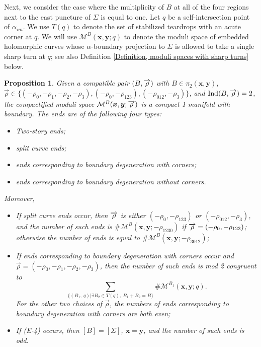\documentclass{amsart}
\newtheorem{prop}[thm]{Proposition}
\theoremstyle{definition}
\theoremstyle{remark}
\numberwithin{equation}{section}
\numberwithin{equation}{section} \makeatletter
\begin{document}
Next, we consider the case where the multiplicity of $B$ at all of the four regions next to the east puncture of $\Sigma$ is equal to one. Let $q$ be a self-intersection point of $\alpha_{im}$. We use $T(q)$ to denote the set of stabilized teardrops with an acute corner at $q$. We will use $\mathcal{M}^{B}(\bm{x},\bm{y};q)$ to denote the moduli space of embedded holomorphic curves whose $\alpha$-boundary projection to $\Sigma$ is allowed to take a single sharp turn at $q$; see also Definition \ref{Definition, moduli spaces with sharp turns} below.  

\begin{prop}\label{Proposition, ends of 1-dimensional moduli spaces of 0-P curves, Reeb element of length 4}
Given a compatible pair $(B,\overrightarrow{\bold{\rho}})$ with $B\in \pi_2(\bm{x},\bm{y})$, $\overrightarrow{\rho}\in\{(-\rho_0,-\rho_1,-\rho_2,-\rho_3),(-\rho_0,-\rho_{123}),(-\rho_{012},-\rho_3)\}$, and $\text{Ind}(B,\overrightarrow{\bold{\rho}})=2$, the compactified moduli space $\mathcal{M}^B(\bm{x},\bm{y};\overrightarrow{\bold{\rho}})$ is a compact 1-manifold with boundary. The ends are of the following four types:
\begin{itemize}
\item[(E-1)]Two-story ends;
\item[(E-2)]split curve ends;
\item[(E-3)]ends corresponding to boundary degeneration with corners;
\item[(E-4)]ends corresponding to boundary degeneration without corners.
\end{itemize}
Moreover, 
\begin{itemize}
\item[(a)]If split curve ends occur, then $\overrightarrow{\bold{\rho}}$ is either $(-\rho_0,-\rho_{123})$ or $(-\rho_{012},-\rho_3)$, and the number of such ends is $\#\mathcal{M}^B(\bm{x},\bm{y};-\rho_{1230})$ if $\overrightarrow{\bold{\rho}}=(-\rho_0,-\rho_{123})$; otherwise the number of ends is equal to $\#\mathcal{M}^B(\bm{x},\bm{y};-\rho_{3012})$;
\item[(b)]If ends corresponding to boundary degeneration with corners occur and $\overrightarrow{\rho}=(-\rho_0,-\rho_1,-\rho_2,-\rho_3)$, then the number of such ends is mod 2 congruent to $$\sum_{\{(B_1,\ q)|\exists B_2\in T(q),\ B_1+B_2=B\}}\#\mathcal{M}^{B_1}(\bm{x},\bm{y};q).$$
For the other two choices of $\overrightarrow{\rho}$, the numbers of ends corresponding to boundary degeneration with corners are both even;
\item[(c)]If (E-4) occurs, then $[B]=[\Sigma]$, $\bm{x}=\bm{y}$, and the number of such ends is odd.
\end{itemize}
\end{prop}
\end{document}
